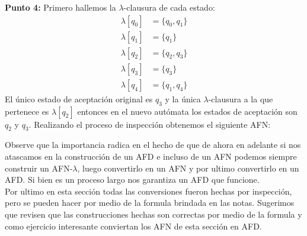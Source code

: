 \textbf{Punto 4: }Primero hallemos la $\lambda$-clausura de cada estado:
\begin{align*}
    \lambda[q_0]&=\{q_0,q_1\}\\
    \lambda[q_1]&=\{q_1\}\\
    \lambda[q_2]&=\{q_2,q_3\}\\
    \lambda[q_3]&=\{q_3\}\\ 
    \lambda[q_4]&=\{q_1,q_4\}
\end{align*}
El único estado de aceptación original es $q_3$ y la única $\lambda$-clausura a la que pertenece es $\lambda[q_2]$ entonces en el nuevo autómata los estados de aceptación son $q_2$ y $q_3$. Realizando el proceso de inspección obtenemos el siguiente AFN:
\pagebreak
\begin{basedtikz}
\end{basedtikz}
Observe que la importancia radica en el hecho de que de ahora en adelante si nos atascamos en la construcción de un AFD e incluso de un AFN podemos siempre construir un AFN-$\lambda$, luego convertirlo en un AFN y por ultimo convertirlo en un AFD. Si bien es un proceso largo nos garantiza un AFD que funcione.\\
Por ultimo en esta sección todas las conversiones fueron hechas por inspección, pero se pueden hacer por medio de la formula brindada en las notas. Sugerimos que revisen que las construcciones hechas son correctas por medio de la formula y como ejercicio interesante conviertan los AFN de esta sección en AFD.

